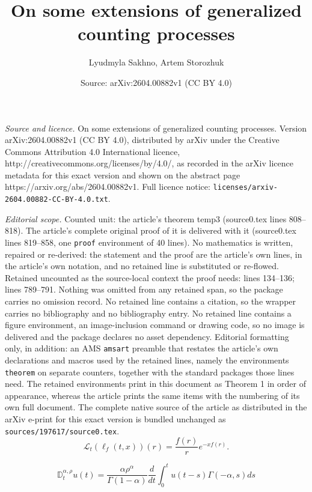 \documentclass[10pt,a4paper]{amsart}
\title{On some extensions of generalized counting processes}
\author{Lyudmyla Sakhno, Artem Storozhuk}
\date{Source: arXiv:2604.00882v1 (CC BY 4.0)}
\begin{document}
\maketitle

\noindent\emph{Source and licence.} On some extensions of generalized counting processes. Version arXiv:2604.00882v1 (CC BY 4.0), distributed by arXiv under the Creative Commons Attribution 4.0 International licence, http://creativecommons.org/licenses/by/4.0/, as recorded in the arXiv licence metadata for this exact version and shown on the abstract page https://arxiv.org/abs/2604.00882v1. Full licence notice: \texttt{licenses/arxiv-2604.00882-CC-BY-4.0.txt}.\par\smallskip

\noindent\textit{Editorial scope.} Counted unit: the article's theorem temp3 (source0.tex lines 808--818). The article's complete original proof of it is delivered with it (source0.tex lines 819--858, one \texttt{proof} environment of 40 lines). No mathematics is written, repaired or re-derived: the statement and the proof are the article's own lines, in the article's own notation, and no retained line is substituted or re-flowed.  Retained uncounted as the source-local context the proof needs: lines 134--136; lines 789--791.  Nothing was omitted from any retained span, so the package carries no omission record.  No retained line contains a citation, so the wrapper carries no bibliography and no bibliography entry.  No retained line contains a figure environment, an image-inclusion command or drawing code, so no image is delivered and the package declares no asset dependency.  Editorial formatting only, in addition: an AMS \texttt{amsart} preamble that restates the article's own declarations and macros used by the retained lines, namely the environments \texttt{theorem} on separate counters, together with the standard packages those lines need.  The retained environments print in this document as Theorem 1 in order of appearance, whereas the article prints the same items with the numbering of its own full document.  The complete native source of the article as distributed in the arXiv e-print for this exact version is bundled unchanged as \texttt{sources/197617/source0.tex}.
\begin{equation}\label{t-lapl-inv}
\mathcal{L}_t\left(\ell_f(t,x)\right)(r)=\frac{f(r)}{r}e^{-xf(r)}.
\end{equation}

\begin{equation}\label{exfDDt}
\mathbb{D}^{\alpha,\rho}_t u(t)=\frac{\alpha \rho^{\alpha}}{\Gamma(1-\alpha)}\frac{d}{dt}\int_{0}^{t}u(t-s)\Gamma(-\alpha,s)ds
\end{equation}
\end{document}
